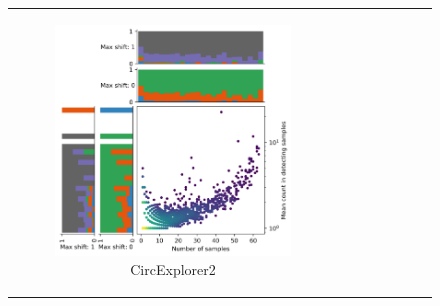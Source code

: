 \begin{figure}[ht] \begin{tabular}{cc} \begin{subfigure}{.4\textwidth}
                                           \centering

                                           \includegraphics[width=\linewidth]{chapters/4_results_and_discussion/figures/detection/density/circexplorer2.png}
                                           \caption{CircExplorer2}

                                           \label{fig:detection_density_circexplorer2} \end{subfigure} &
               \begin{subfigure}{.4\textwidth} \centering


\end{subfigure}
\end{tabular}
\end{figure}
